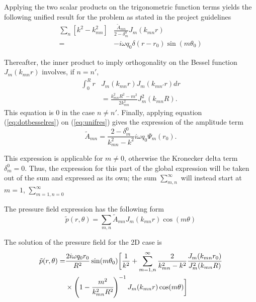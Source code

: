 \documentclass[%
 reprint,
 amsmath,amssymb,
 aip,
]{revtex4-1}
\begin{document}
Applying the two scalar products on the trigonometric function terms yields the following unified result for the problem as stated in the project guidelines \cite{guidelines}
\begin{equation}
    \begin{split}
    \sum_n \left[ k^2 - k_{mn}^2 \right] &\frac{\tilde{A}_{mn}}{2 - \delta_m^0} J_m(k_{mn}r)\\=& - i \omega q_0 \delta(r - r_0) \sin(m\theta_0)
    \end{split} \label{eq:unifres}
\end{equation}

Thereafter, the inner product to imply orthogonality on the Bessel function $J_m (k_{mn} r)$ involves, if $n = n'$,
\begin{equation}
    \begin{split}
        \int_0^R r& J_m (k_{mn} r) J_m (k_{mn'} r) dr\\ &= \frac{k^2_{mn} R^2 - m^2}{2 k^2_{mn}} J^2_m (k_{mn} R).    \end{split} \label{eq:dotbesselres}
\end{equation}
This equation is 0 in the case $n \ne n'$. Finally, applying equation (\ref{eq:dotbesselres}) on (\ref{eq:unifres}) gives the expression of the amplitude term
\begin{equation}
    \tilde{A}_{mn} = \frac{2 - \delta_m^0}{k^2_{mn} - k^2} i \omega q_0 \Psi_{m}(r_0).
\end{equation}

This expression is applicable for $m \ne 0$, otherwise the Kronecker delta term $\delta_m^0 = 0$. Thus, the expression for this part of the global expression will be taken out of the sum and expressed as its own; the sum $\sum_{m, n}^{\infty}$ will instead start at $m = 1$, $\sum_{m=1, n=0}^{\infty}$

The pressure field expression has the following form 
\begin{equation}
    \tilde{p}(r, \theta) = \sum_{m,n} \tilde{A}_{mn} J_m(k_{mn}r)\cos(m \theta)
\end{equation}

The solution of the pressure field for the 2D case is 
\begin{equation}
   \begin{split}
       \tilde{p}(r, \theta) =& \frac{2 i \omega q_0 r_0}{R^2} \sin(m\theta_0) \bigg[ \frac{1}{k^2} + \sum_{m=1,n}^{\infty} \frac{2}{k^2_{mn} - k^2} \frac{J_m (k_{mn} r_0)}{J^2_m(k_{mn}R)}\\ &\times \left(1 - \cfrac{m^2}{k^2_{mn}R^2}\right)^{-1} J_m(k_{mn}r)\cos(m \theta) \bigg] 
   \end{split} 
\end{equation}
\end{document}
